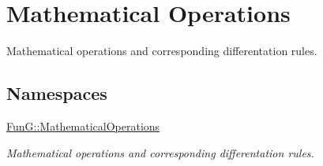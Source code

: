 \hypertarget{group__MathematicalOperationsGroup}{}\section{Mathematical Operations}
\label{group__MathematicalOperationsGroup}


Mathematical operations and corresponding differentation rules.  


\subsection*{Namespaces}
\begin{DoxyCompactItemize}
\item 
 \hyperlink{namespaceFunG_1_1MathematicalOperations}{Fun\+G\+::\+Mathematical\+Operations}
\begin{DoxyCompactList}\small\item\em Mathematical operations and corresponding differentation rules. \end{DoxyCompactList}\end{DoxyCompactItemize}

